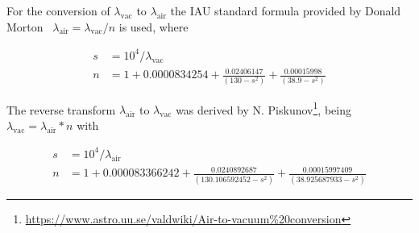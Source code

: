 For the conversion of $\lambda_\textrm{vac}$ to $\lambda_\textrm{air}$ the \ac{IAU} standard formula provided by Donald Morton~\cite{mor00} $\lambda_\textrm{air}=\lambda_\textrm{vac}/n$ is used, where

\begin{align}
    s &=10^4 / \lambda_{\textrm{vac}}\\
    n &= 1+0.0000834254 + \frac{0.02406147}{(130 - s^2)} + \frac{0.00015998}{(38.9 - s^2)} \label{eq:air2vacB}
\end{align}

The reverse transform $\lambda_\textrm{air}$ to $\lambda_\textrm{vac}$ was derived by N. Piskunov\footnote{\url{https://www.astro.uu.se/valdwiki/Air-to-vacuum\%20conversion}}, being $\lambda_\textrm{vac}=\lambda_\textrm{air}*n$ with 

\begin{align}
    s&=10^4 / \lambda_{\textrm{air}}\\
    n&=1 + 0.000083366242 + \frac{0.0240892687}{(130.106592452 - s^2)} + \frac{0.00015997409}{(38.925687933 - s^2)} \label{eq:vac2air}
\end{align}

